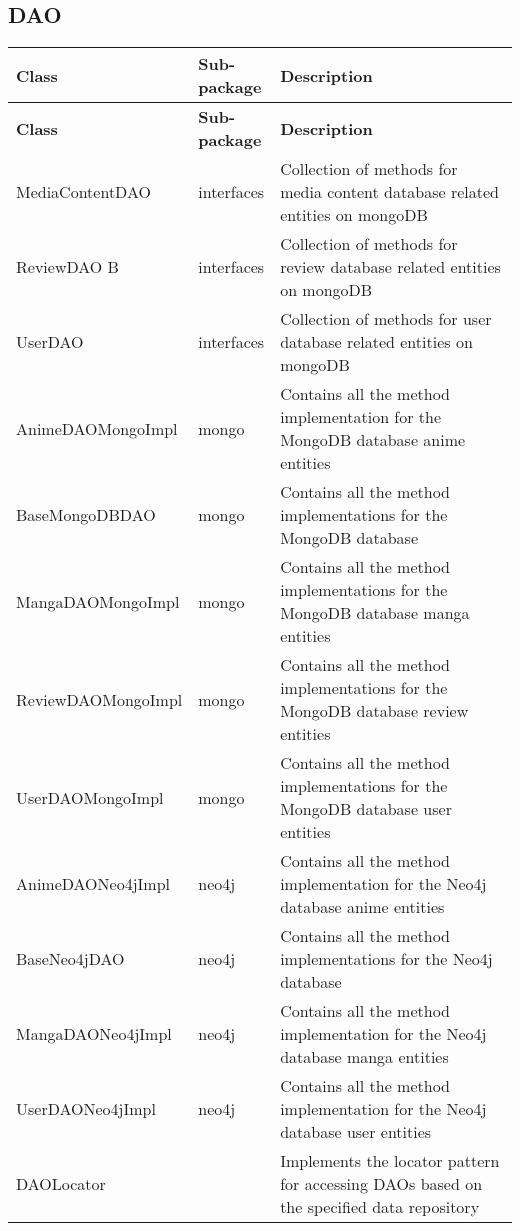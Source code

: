 \subsection*{DAO}
\renewcommand{\arraystretch}{1.5}
\begin{longtable}{|>{\raggedright\arraybackslash}p{0.3\linewidth}|>{\raggedright\arraybackslash}p{0.1\linewidth}|>{\raggedright\arraybackslash}p{0.6\linewidth}|}
    \hline
    \textbf{Class} & \textbf{Sub-package} & \textbf{Description} \\
    \hline
    \endfirsthead

    \hline
    \textbf{Class} & \textbf{Sub-package} & \textbf{Description} \\
    \hline
    \endhead

    \hline
    \endfoot

    \hline
    \endlastfoot

    MediaContentDAO & interfaces & Collection of methods for media content database related entities on mongoDB \\
    \hline
    ReviewDAO B & interfaces & Collection of methods for review database related entities on mongoDB \\
    \hline
    UserDAO & interfaces & Collection of methods for user database related entities on mongoDB \\
    \hline
    AnimeDAOMongoImpl & mongo & Contains all the method implementation for the MongoDB database anime entities \\
    \hline      
    BaseMongoDBDAO & mongo & Contains all the method implementations for the MongoDB database \\
    \hline
    MangaDAOMongoImpl & mongo & Contains all the method implementations for the MongoDB database manga entities \\
    \hline
    ReviewDAOMongoImpl & mongo & Contains all the method implementations for the MongoDB database review entities \\
    \hline
    UserDAOMongoImpl & mongo & Contains all the method implementations for the MongoDB database user entities \\
    \hline
    AnimeDAONeo4jImpl & neo4j & Contains all the method implementation for the Neo4j database anime entities \\
    \hline
    BaseNeo4jDAO & neo4j & Contains all the method implementations for the Neo4j database \\
    \hline
    MangaDAONeo4jImpl & neo4j & Contains all the method implementation for the Neo4j database manga entities \\
    \hline
    UserDAONeo4jImpl & neo4j & Contains all the method implementation for the Neo4j database user entities \\
    \hline
    DAOLocator & & Implements the locator pattern for accessing DAOs based on the specified data repository \\
    \hline
\end{longtable}

